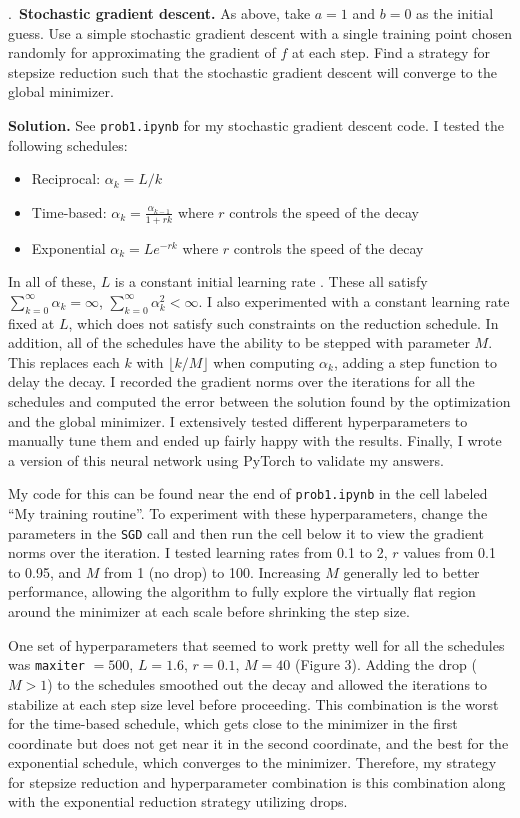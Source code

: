 \documentclass{letter}
\newcounter{problem}
\newcounter{solution}
\newcommand{\Problem}[2]{%
	\stepcounter{problem}%
	\leftskip=0pt%
	\theproblem.~\textbf{{#1.}} #2 \par%
}
\newcommand{\Solution}[1]{%
	\textbf{Solution.} #1 \par%
}
\begin{document}
    \Problem{Stochastic gradient descent}{As above, take $a = 1$ and $b = 0$ as the initial guess. Use a simple stochastic gradient descent with a single training point chosen randomly for approximating the gradient of $f$ at each step. Find a strategy for stepsize reduction such that the stochastic gradient descent will converge to the global minimizer.}
    \Solution{See \texttt{prob1.ipynb} for my stochastic gradient descent code. I tested the following schedules: \begin{itemize}
        \item Reciprocal: $\alpha_k = L/k$
        \item Time-based: $\alpha_k = \frac{\alpha_{k-1}}{1 + rk}$ where $r$ controls the speed of the decay
        \item Exponential $\alpha_k = Le^{-rk}$ where $r$ controls the speed of the decay
    \end{itemize} In all of these, $L$ is a constant initial learning rate . These all satisfy $\sum_{k=0}^\infty \alpha_k = \infty$, $\sum_{k=0}^\infty \alpha_k^2 < \infty$. I also experimented with a constant learning rate fixed at $L$, which does not satisfy such constraints on the reduction schedule. In addition, all of the schedules have the ability to be stepped with parameter $M$. This replaces each $k$ with $\lfloor k / M \rfloor$ when computing $\alpha_k$, adding a step function to delay the decay. I recorded the gradient norms over the iterations for all the schedules and computed the error between the solution found by the optimization and the global minimizer. I extensively tested different hyperparameters to manually tune them and ended up fairly happy with the results. Finally, I wrote a version of this neural network using PyTorch to validate my answers.
    
    My code for this can be found near the end of \texttt{prob1.ipynb} in the cell labeled ``My training routine''. To experiment with these hyperparameters, change the parameters in the \texttt{SGD} call and then run the cell below it to view the gradient norms over the iteration. I tested learning rates from 0.1 to 2, $r$ values from 0.1 to 0.95, and $M$ from 1 (no drop) to 100. Increasing $M$ generally led to better performance, allowing the algorithm to fully explore the virtually flat region around the minimizer at each scale before shrinking the step size.

    One set of hyperparameters that seemed to work pretty well for all the schedules was \texttt{maxiter} $= 500$, $L = 1.6$, $r = 0.1$, $M = 40$ (Figure 3). Adding the drop ($M > 1$) to the schedules smoothed out the decay and allowed the iterations to stabilize at each step size level before proceeding. This combination is the worst for the time-based schedule, which gets close to the minimizer in the first coordinate but does not get near it in the second coordinate, and the best for the exponential schedule, which converges to the minimizer. Therefore, my strategy for stepsize reduction and hyperparameter combination is this combination along with the exponential reduction strategy utilizing drops.

}
\end{document}
